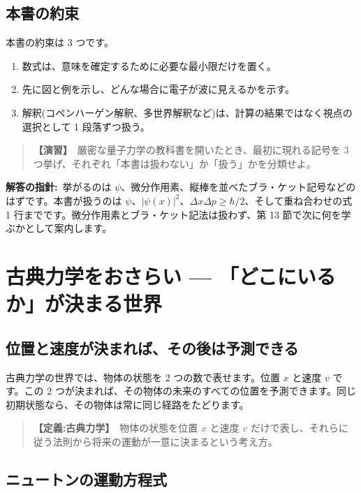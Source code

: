 \documentclass{article}
\begin{document}
\subsection{本書の約束}

本書の約束は 3 つです。
\begin{enumerate}
\item 数式は、意味を確定するために必要な最小限だけを置く。
\item 先に図と例を示し、どんな場合に電子が波に見えるかを示す。
\item 解釈(コペンハーゲン解釈、多世界解釈など)は、計算の結果ではなく視点の選択として 1 段落ずつ扱う。
\end{enumerate}

\begin{quote}
\textbf{【演習】}\ 厳密な量子力学の教科書を開いたとき、最初に現れる記号を 3 つ挙げ、それぞれ「本書は扱わない」か「扱う」かを分類せよ。
\end{quote}

\textbf{解答の指針:}\ 挙がるのは \(\psi\)、微分作用素、縦棒を並べたブラ・ケット記号などのはずです。本書が扱うのは \(\psi\)、\(|\psi(x)|^2\)、\(\Delta x \Delta p \ge \hbar / 2\)、そして重ね合わせの式 1 行までです。微分作用素とブラ・ケット記法は扱わず、第 13 節で次に何を学ぶかとして案内します。

\section{古典力学をおさらい — 「どこにいるか」が決まる世界}

\subsection{位置と速度が決まれば、その後は予測できる}

古典力学の世界では、物体の状態を 2 つの数で表せます。位置 \(x\) と速度 \(v\) です。この 2 つが決まれば、その物体の未来のすべての位置を予測できます。同じ初期状態なら、その物体は常に同じ経路をたどります。

\begin{quote}
\textbf{【定義:古典力学】}\ 物体の状態を位置 \(x\) と速度 \(v\) だけで表し、それらに従う法則から将来の運動が一意に決まるという考え方。
\end{quote}

\subsection{ニュートンの運動方程式}
\end{document}
